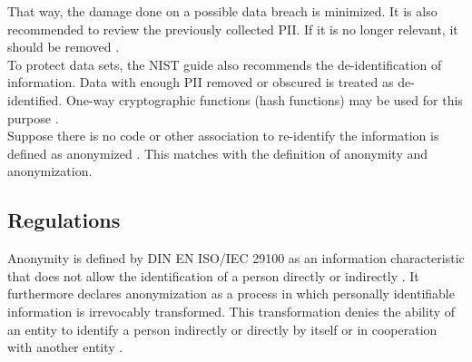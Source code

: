         That way, the damage done on a possible data breach is minimized. It is also recommended to review the previously collected PII. If it is no longer relevant, it should be removed \cite{mccallister_guide_2010}.\\
        To protect data sets, the NIST guide also recommends the de-identification of information. Data with enough PII removed or obscured is treated as de-identified. One-way cryptographic functions (hash functions) may be used for this purpose \cite{mccallister_guide_2010}.\\
        Suppose there is no code or other association to re-identify the information is defined as anonymized \cite{mccallister_guide_2010}. This matches with the definition of anonymity and anonymization.


    \newpage
    \subsection{Regulations}
        \label{subsec:related:law}
        
        Anonymity is defined by DIN EN ISO/IEC 29100 as an information characteristic that does not allow the identification of a person directly or indirectly \cite{german_institute_for_standardization_din_2020}. It furthermore declares anonymization as a process in which personally identifiable information is irrevocably transformed. This transformation denies the ability of an entity to identify a person indirectly or directly by itself or in cooperation with another entity \cite{german_institute_for_standardization_din_2020}.\\
        
